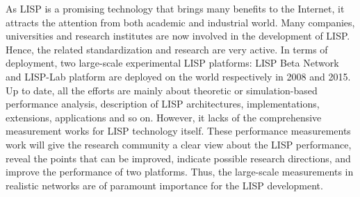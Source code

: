 
As LISP is a promising technology that brings many benefits to the Internet, it attracts the attention from both academic and industrial world. Many companies, universities and research institutes are now involved in the development of LISP. Hence, the related standardization and research are very active. In terms of deployment, two large-scale experimental LISP platforms: LISP Beta Network and LISP-Lab platform are deployed on the world respectively in 2008 and 2015. Up to date, all the efforts are mainly about theoretic or simulation-based performance analysis, description of LISP architectures, implementations, extensions, applications and so on. However, it lacks of the comprehensive measurement works for LISP technology itself. These performance measurements work will give the research community a clear view about the LISP performance, reveal the points that can be improved, indicate possible research directions, and improve the performance of two platforms. Thus, the large-scale measurements in realistic networks are of paramount importance for the LISP development.

